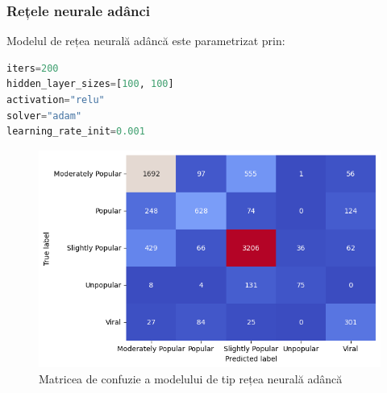 \documentclass{article}
\begin{document}
\subsubsection{Rețele neurale adânci}
Modelul de rețea neurală adâncă este parametrizat prin:
\begin{lstlisting}[language=Python]
iters=200
hidden_layer_sizes=[100, 100]
activation="relu"
solver="adam"
learning_rate_init=0.001
\end{lstlisting}

\begin{figure}[htb]
    \centering
    \includegraphics[scale=0.5]{news_popularity/learning/neural_network_conf.png}
    \caption{Matricea de confuzie a modelului de tip rețea neurală adâncă}
    \label{fig:news:nn_conf}
\end{figure}
\end{document}
